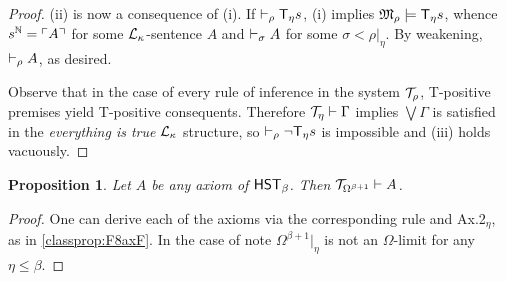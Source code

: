 \documentclass[UKenglish,cleveref,DIV=12]{scrartcl}
\newtheorem{proposition}[lemma]{Proposition}
\newtheorem{corollary}[lemma]{Corollary}
\theoremstyle{definition}
\theoremstyle{definition}
\begin{document}
\begin{proof}
(ii) is now a consequence of (i). If $\vdash_\rho  \mathsf{T}_\eta s$, (i) implies
$\mathfrak{M}_\rho\models \mathsf{T}_\eta s$, whence $s^\mathbb N=\ulcorner{A}\urcorner$ for some
$\mathcal{L}_\kappa$-sentence $A$ and $\vdash_\sigma  A$ for some
$\sigma<\rho|_\eta$. By weakening, $\vdash_\rho  A$, as desired.

Observe that in the case of every rule of inference in the system $\mathcal{T}_\rho$, T-positive
premises yield T-positive consequents. Therefore $\mathcal{T}_\eta\vdash\Gamma$ implies $\bigvee\Gamma$
is satisfied in the \emph{everything is true} $\mathcal{L}_\kappa$ structure, so
$\vdash_\rho \lnot \mathsf{T}_\eta s$ is impossible and (iii) holds vacuously.
\end{proof}

\begin{proposition}\label{prop:FFembed}
 Let $A$ be any axiom of $\mathsf{HST}_\beta$. Then $\mathcal{T}_{\Omega^{\beta+1}}\vdash A$.
\end{proposition}
\begin{proof}
 One can derive each of the axioms via the corresponding rule and Ax.2$_\eta$, as in \cref{classprop:F8axF}. In the case of \Uni\eta note $\Omega^{\beta+1}|_\eta$ is not an $\Omega$-limit for any $\eta\le\beta$.
\end{proof}
\end{document}

